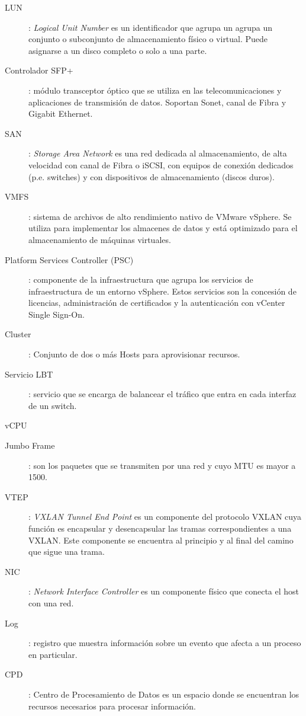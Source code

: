 \begin{description}
 \label{itm:almacendatos}
 \item [LUN]: \textit{Logical Unit Number} es un identificador que agrupa un agrupa un conjunto o subconjunto de almacenamiento físico o virtual. Puede asignarse a un disco completo o solo a una parte.
 \label{itm:lun}
 \item [Controlador SFP+]: módulo transceptor óptico que se utiliza en las telecomunicaciones y aplicaciones de transmisión de datos. Soportan Sonet, canal de Fibra y Gigabit Ethernet.
 \label{itm:sfp}
 \item [SAN]: \textit{Storage Area Network} es una red dedicada al almacenamiento, de alta velocidad con canal de Fibra o iSCSI, con equipos de conexión dedicados (p.e. switches) y con dispositivos de almacenamiento (discos duros). 
 \label{itm:san}
 \item [VMFS]: sistema de archivos de alto rendimiento nativo de VMware vSphere. Se utiliza para implementar los almacenes de datos y está optimizado para el almacenamiento de máquinas virtuales.
 \label{itm:vmfs}
 \item [Platform Services Controller (PSC)]: componente de la infraestructura que agrupa los servicios de infraestructura de un entorno vSphere. Estos servicios son la concesión de licencias, administración de certificados y la autenticación con vCenter Single Sign-On.
 \label{itm:psc}
 \item [Cluster]: Conjunto de dos o más Hosts para aprovisionar recursos.
 \label{itm:cluster}
 \item [Servicio LBT]: servicio que se encarga de balancear el tráfico que entra en cada interfaz de un switch.
 \item [vCPU]
 \label{itm:vcpu}
 \item [Jumbo Frame]: son los paquetes que se transmiten por una red y cuyo MTU es mayor a 1500.
 \label{itm:jumboframe}
 \item [VTEP]: \textit{VXLAN Tunnel End Point} es un componente del protocolo VXLAN cuya función es encapsular y desencapsular las tramas correspondientes a una VXLAN. Este componente se encuentra al principio y al final del camino que sigue una trama.
 \label{itm:vtep}
 \item [NIC]: \textit{Network Interface Controller} es un componente físico que conecta el host con una red.
 \label{itm:nic}
 \item [Log]: registro que muestra información sobre un evento que afecta a un proceso en particular.
 \label{itm:log}
  \item [CPD]: Centro de Procesamiento de Datos es un espacio donde se encuentran los recursos necesarios para procesar información.

\end{description}
